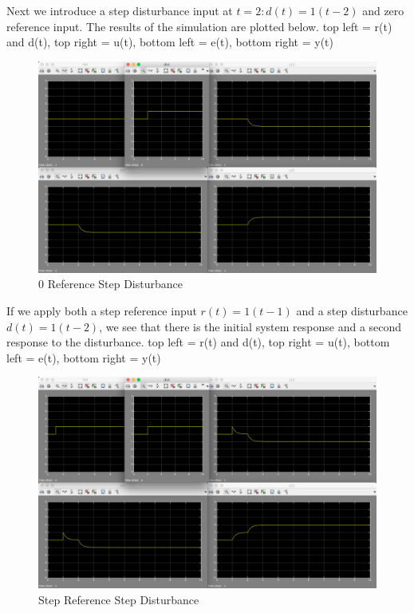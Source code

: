 \documentclass[10pt,titlepage]{article}
\begin{document}
		Next we introduce a step disturbance input at $t=2: d(t)=1(t-2)$ and zero reference input. The results of the simulation are plotted below. top left = r(t) and d(t), top right = u(t), bottom left = e(t), bottom right = y(t)
		\begin{figure}[H]
			\centering
			\includegraphics[scale=0.3]{e6-2}
			\caption{0 Reference Step Disturbance}
		\end{figure}	
		
		If we apply both a step reference input $r(t)=1(t-1)$ and a step disturbance $d(t)=1(t-2)$, we see that there is the initial system response and a second response to the disturbance.
		top left = r(t) and d(t), top right = u(t), bottom left = e(t), bottom right = y(t)
		\begin{figure}[H]
			\centering
			\includegraphics[scale=0.3]{e6-3}
			\caption{Step Reference Step Disturbance}
		\end{figure}
		
\end{document}

